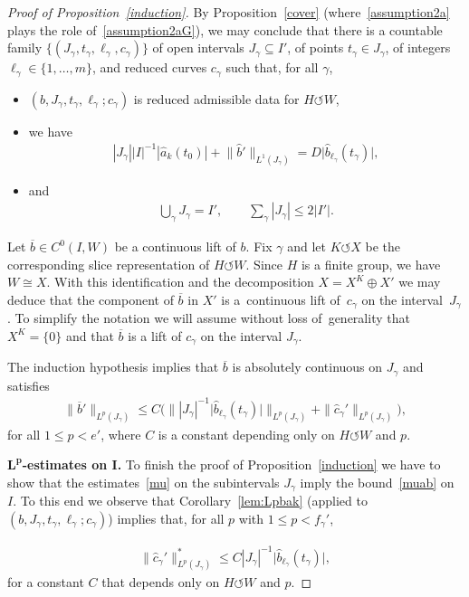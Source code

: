 \documentclass[pdftex]{sigma}
\numberwithin{equation}{section}
\def\ga{\gamma}
\def\ol{\overline}
\def\acts{\circlearrowleft}
\begin{document}
\begin{proof}[Proof of Proposition~\ref{induction}]
By Proposition~\ref{cover} (where~\eqref{assumption2a} plays the role of~\eqref{assumption2aG}),
we may conclude that there is a countable family $\{(J_\ga,t_\ga,\ell_\ga,c_\ga)\}$ of open intervals $J_\ga \subseteq I'$,
of points $t_\ga \in J_\ga$,
of integers $\ell_\ga \in \{1, \dots,m\}$,
and reduced curves $c_\ga$ such that, for all $\ga$,
\begin{itemize}
	\item $(b,J_\ga,t_\ga,\ell_\ga;c_\ga)$ is reduced admissible data for $H \acts W$,
	\item we have
	\begin{gather}
 |J_\ga| |I|^{-1} {|\hat a_k(t_0)|} + \big\|\hat b'\big\|_{L^1 (J_\ga)} =
 D \big|\hat b_{\ell_\ga}(t_\ga)\big|, \label{Jba}
\end{gather}
\item and
\begin{gather}
	\bigcup_\ga J_\ga = I', \qquad \sum_\ga |J_\ga| \le 2 |I'|. \label{Jga}
\end{gather}
\end{itemize}


Let $\ol b \in C^0(I,W)$ be a continuous lift of $b$.
Fix $\ga$ and let $K \acts X$ be the corresponding slice representation of $H \acts W$.
Since $H$ is a finite group, we have $W \cong X$. With this identification and the decomposition $X = X^K \oplus X'$
we may deduce that the component of $\ol b$ in $X'$
is a~continuous lift of~$c_\ga$ on the interval~$J_\ga$.
To simplify the notation we will assume without loss of~generality that $X^{K} = \{0\}$ and that
$\ol b$ is a lift of $c_\ga$ on the interval $J_\ga$.

The induction hypothesis implies that
$\ol b$ is absolutely continuous on $J_\ga$ and satisfies
\begin{gather} \label{mu}
\big \|\ol b'\big\|_{L^p(J_\ga)} \le C \Big( \big\| |J_\ga|^{-1} {\big|\hat b_{\ell_\ga}(t_\ga)\big|} \big\|_{L^p (J_\ga)}
 + \|\hat c_{\ga}'\|_{L^p (J_\ga)}\Big),
\end{gather}
for all $1 \le p < e'$, where $C$ is a constant depending only on $H \acts W$ and $p$.


\medskip\noindent
{\bf $\boldsymbol{L^p}$-estimates on $\boldsymbol I$.}
To finish the proof of Proposition~\ref{induction} we have to show that the estimates~\eqref{mu}
on the subintervals $J_\ga$
imply the bound~\eqref{muab} on~$I$.
To this end we observe that Corollary~\ref{lem:Lpbak} (applied to $(b,J_\ga,t_\ga,\ell_\ga;c_\ga)$)
implies that,
for all $p$ with $1 \le p < f_\ga'$,
{\samepage\begin{gather} \label{eq:ctob}
 \|\hat c_{\ga}'\|^*_{L^p(J_\ga)}
 \le C |J_\ga|^{-1} \big|\hat b_{\ell_\ga} (t_\ga)\big|,
\end{gather}
for a constant $C$ that depends only on $H \acts W$ and $p$.

}
\end{proof}
\end{document}
